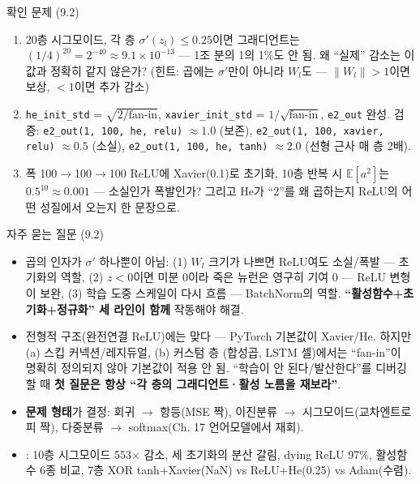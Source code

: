 \documentclass[aspectratio=169,11pt]{beamer}
\begin{document}
\begin{frame}{확인 문제 (9.2)}
  \small
  \begin{enumerate}
    \item {} 20층 시그모이드, 각 층 $\sigma'(z_l) \le 0.25$이면
      그래디언트는 $(1/4)^{20} = 2^{-40} \approx 9.1 \times 10^{-13}$
      — 1조 분의 1의 1\%도 안 됨. 왜 ``실제'' 감소는 이 값과 정확히
      같지 않은가? (힌트: 곱에는 $\sigma'$만이 아니라 $W_l$도 —
      $\|W_l\| > 1$이면 보상, $< 1$이면 추가 감소)
    \item {} \texttt{he\_init\_std} = $\sqrt{2/\text{fan-in}}$,
      \texttt{xavier\_init\_std} = $1/\sqrt{\text{fan-in}}$,
      \texttt{e2\_out} 완성.
      검증: \texttt{e2\_out(1, 100, he, relu)} $\approx 1.0$ (보존),
      \texttt{e2\_out(1, 100, xavier, relu)} $\approx 0.5$ (소실),
      \texttt{e2\_out(1, 100, he, tanh)} $\approx 2.0$ (선형 근사
      매 층 2배).
    \item {} 폭 100$\to$100$\to$100 ReLU에 Xavier(0.1)로
      초기화, 10층 반복 시 $\mathbb{E}[a^2]$는 $0.5^{10} \approx 0.001$ —
      소실인가 폭발인가? 그리고 He가 ``2''를 왜 곱하는지 ReLU의
      어떤 성질에서 오는지 한 문장으로.
  \end{enumerate}
\end{frame}

\begin{frame}{자주 묻는 질문 (9.2)}
  \small
  \begin{itemize}
    \item {}
      곱의 인자가 $\sigma'$ 하나뿐이 아님: (1) $W_l$ 크기가 나쁘면
      ReLU여도 소실/폭발 — 초기화의 역할, (2) $z<0$이면 미분 0이라
      죽은 뉴런은 영구히 기여 0 — ReLU 변형이 보완, (3) 학습 도중
      스케일이 다시 흐름 — BatchNorm의 역할.
      \textbf{``활성함수+초기화+정규화'' 세 라인이 함께} 작동해야
      해결.
    \item {}
      전형적 구조(완전연결 ReLU)에는 맞다 — PyTorch 기본값이
      Xavier/He. 하지만 (a) 스킵 커넥션/레지듀얼, (b) 커스텀 층
      (합성곱, LSTM 셀)에서는 ``fan-in''이 명확히 정의되지 않아
      기본값이 적용 안 됨. ``학습이 안 된다/발산한다''를 디버깅할
      때 \textbf{첫 질문은 항상 ``각 층의 그래디언트·활성 노름을
      재보라''}.
    \item {} \textbf{문제 형태}가 결정:
      회귀 $\to$ 항등(MSE 짝), 이진분류 $\to$ 시그모이드(교차엔트로피
      짝), 다중분류 $\to$ softmax(Ch. 17 언어모델에서 재회).
    \item {}: 10층 시그모이드 553$\times$ 감소, 세 초기화의
      분산 갈림, dying ReLU 97\%, 활성함수 6종 비교, 7층 XOR
      tanh+Xavier(NaN) vs ReLU+He(0.25) vs Adam(수렴).
  \end{itemize}
\end{frame}
\end{document}
